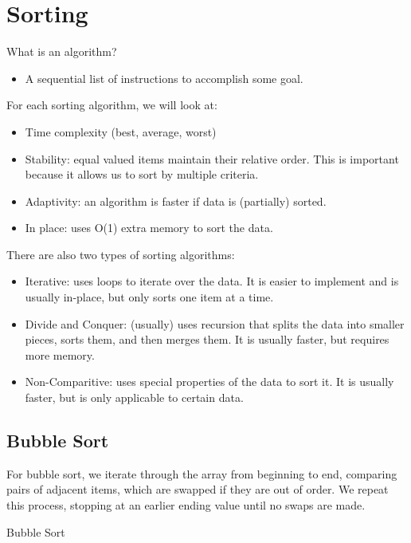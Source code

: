 \documentclass[a4paper]{article}
\begin{document}

\section{Sorting}
What is an algorithm?

\begin{itemize}
	\item A sequential list of instructions to accomplish some goal.
\end{itemize}

For each sorting algorithm, we will look at:
\begin{itemize}
	\item Time complexity (best, average, worst)
	\item Stability: equal valued items maintain their relative order. This is important because it allows us to sort by multiple criteria.
	\item Adaptivity: an algorithm is faster if data is (partially) sorted.
	\item In place: uses O(1) extra memory to sort the data.
\end{itemize}

There are also two types of sorting algorithms:
\begin{itemize}
	\item Iterative: uses loops to iterate over the data. It is easier to implement and is usually in-place, but only sorts one item at a time.
	\item Divide and Conquer: (usually) uses recursion that splits the data into smaller pieces, sorts them, and then merges them. It is usually faster, but requires more memory.
	\item Non-Comparitive: uses special properties of the data to sort it. It is usually faster, but is only applicable to certain data.
\end{itemize}

\subsection{Bubble Sort}

For bubble sort, we iterate through the array from beginning to end, comparing pairs of adjacent items, which are swapped if they are out of order. We repeat this process, stopping at an earlier ending value until no swaps are made.

\begin{algorithm}
	\caption{Bubble Sort}
\end{algorithm}
\end{document}
